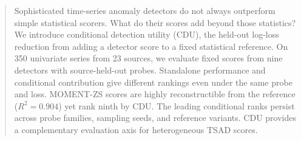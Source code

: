 \begin{abstract}
Sophisticated time-series anomaly detectors do not always outperform simple statistical scorers. What do their scores add beyond those statistics? We introduce conditional detection utility (CDU), the held-out log-loss reduction from adding a detector score to a fixed statistical reference. On 350 univariate series from 23 sources, we evaluate fixed scores from nine detectors with source-held-out probes. Standalone performance and conditional contribution give different rankings even under the same probe and loss. MOMENT-ZS scores are highly reconstructible from the reference ($R^2=0.904$) yet rank ninth by CDU. The leading conditional ranks persist across probe families, sampling seeds, and reference variants. CDU provides a complementary evaluation axis for heterogeneous TSAD scores.
\end{abstract}
